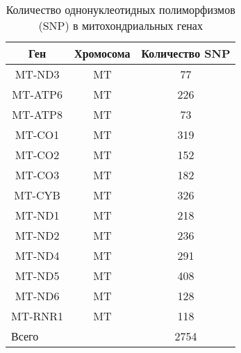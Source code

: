 \begin{table} [htbp]
	\centering
	\begin{threeparttable}
		\caption{Количество однонуклеотидных полиморфизмов (SNP) в митохондриальных генах}%
		\label{tab:snp_mt}%
		\begin{SingleSpace}
			\begin{tabular}{| c | c | c |}
				\hline
				Ген & Хромосома & Количество SNP \\ \hline
				MT-ND3        & MT                  & 77             \\ \hline
				MT-ATP6       & MT                  & 226            \\ \hline
				MT-ATP8       & MT                  & 73             \\ \hline
				MT-CO1        & MT                  & 319            \\ \hline
				MT-CO2        & MT                  & 152            \\ \hline
				MT-CO3        & MT                  & 182            \\ \hline
				MT-CYB        & MT                  & 326            \\ \hline
				MT-ND1        & MT                  & 218            \\ \hline
				MT-ND2        & MT                  & 236            \\ \hline
				MT-ND4        & MT                  & 291            \\ \hline
				MT-ND5        & MT                  & 408            \\ \hline
				MT-ND6        & MT                  & 128            \\ \hline
				MT-RNR1       & MT                  & 118            \\ \hline
				\multicolumn{2}{|l|}{Всего} 		& 2754		     \\ \hline
			\end{tabular}%
		\end{SingleSpace}
	\end{threeparttable}
\end{table}

